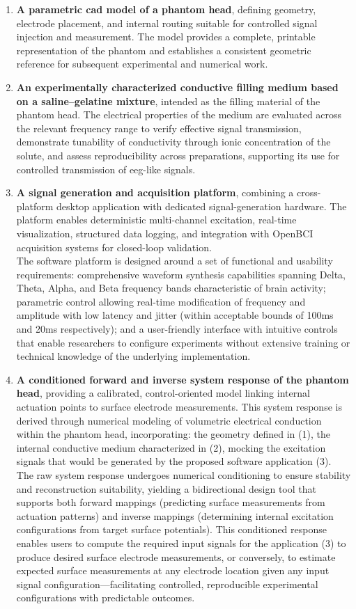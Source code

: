 \documentclass[../00_Main.tex]{subfiles}
\begin{document}
\begin{enumerate}
    \item \textbf{A parametric \gls{cad} model of a phantom head}, defining geometry, electrode placement, and internal routing suitable for controlled signal injection and measurement. The model provides a complete, printable representation of the phantom and establishes a consistent geometric reference for subsequent experimental and numerical work.
    \item \textbf{An experimentally characterized conductive filling medium based on a saline--gelatine mixture}, intended as the filling material of the phantom head. The electrical properties of the medium are evaluated across the relevant frequency range to verify effective signal transmission, demonstrate tunability of conductivity through ionic concentration of the solute, and assess reproducibility across preparations, supporting its use for controlled transmission of \gls{eeg}-like signals.
    \item \textbf{A signal generation and acquisition platform}, combining a cross-platform desktop application with dedicated signal-generation hardware. The platform enables deterministic multi-channel excitation, real-time visualization, structured data logging, and integration with OpenBCI acquisition systems for closed-loop validation.
    \\ The software platform is designed around a set of functional and usability requirements: comprehensive waveform synthesis capabilities spanning Delta, Theta, Alpha, and Beta frequency bands characteristic of brain activity; parametric control allowing real-time modification of frequency and amplitude with low latency and jitter (within acceptable bounds of 100ms and 20ms respectively); and a user-friendly interface with intuitive controls that enable researchers to configure experiments without extensive training or technical knowledge of the underlying implementation.
    \item \textbf{A conditioned forward and inverse system response of the phantom head}, providing a calibrated, control-oriented model linking internal actuation points to surface electrode measurements. This system response is derived through numerical modeling of volumetric electrical conduction within the phantom head, incorporating: the geometry defined in (1), the internal conductive medium characterized in (2), mocking the excitation signals that would be generated by the proposed software application (3). \\The raw system response undergoes numerical conditioning to ensure stability and reconstruction suitability, yielding a bidirectional design tool that supports both forward mappings (predicting surface measurements from actuation patterns) and inverse mappings (determining internal excitation configurations from target surface potentials). This conditioned response enables users to compute the required input signals for the application (3) to produce desired surface electrode measurements, or conversely, to estimate expected surface measurements at any electrode location given any input signal configuration—facilitating controlled, reproducible experimental configurations with predictable outcomes.

\end{enumerate}
\end{document}

